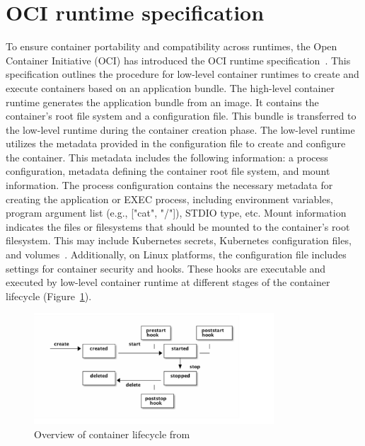 \section{OCI runtime specification}
\label{sec:back_oci_runtime_spec}
To ensure container portability and compatibility across runtimes, the Open Container Initiative (OCI) has introduced the OCI runtime specification~\cite*{oci-runtime-spec}. This specification outlines the procedure for low-level container runtimes to create and execute containers based on an 
application bundle. The high-level container runtime generates the application bundle from an image. It contains the container's root file system and a configuration file. This bundle is transferred to the low-level runtime during the container creation phase. 
The low-level runtime utilizes the metadata provided in the configuration file to create and configure the container. This metadata includes the following information: a process configuration, metadata defining the container root file system, and mount information. The process configuration contains 
the necessary metadata for creating the application or EXEC process, including environment variables, program argument list (e.g., ["cat", "/"]), STDIO type, etc. Mount information indicates the files or filesystems that should be mounted to the container's root filesystem. This may include 
Kubernetes secrets, Kubernetes configuration files, and volumes~\cite*{k8s}. Additionally, on Linux platforms, the configuration file includes settings for container security and hooks. These hooks are executable and executed by low-level container runtime at 
different stages of the container lifecycle (Figure~\ref{fig:Container_Lifecycle_state}).
\begin{figure}[htp]
  \centering
  \includegraphics[width=0.8\textwidth]{images/Container_Lifecycle_state.PNG}
  \caption[Overview of container lifecycle]{Overview of container lifecycle from \cite*{oci_Lifecycle}}
  \label{fig:Container_Lifecycle_state}
\end{figure}

